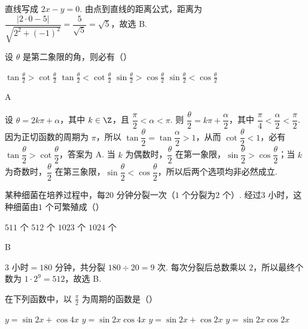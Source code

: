 \begin{solution}
直线写成 \(2x-y=0\). 由点到直线的距离公式，距离为 \(\dfrac{|2\cdot0-5|}{\sqrt{2^{2}+(-1)^{2}}}=\dfrac{5}{\sqrt5}=\sqrt5\)，故选 B.
\end{solution}

\begin{problem}
设 \(\theta\) 是第二象限的角，则必有（\quad）

\choices
    {\(\tan \frac{\theta}{2} > \cot \frac{\theta}{2}\)}
    {\(\tan \frac{\theta}{2} < \cot \frac{\theta}{2}\)}
    {\(\sin \frac{\theta}{2} >\cos \frac{\theta}{2}\)}
    {\(\sin \frac{\theta}{2} < \cos \frac{\theta}{2}\)}
\end{problem}

\begin{answer}
A
\end{answer}

\begin{solution}
设 \(\theta=2k\pi+\alpha\)，其中 \(k\in\Z\)，且 \(\dfrac{\pi}{2}<\alpha<\pi\). 则 \(\dfrac{\theta}{2}=k\pi+\dfrac{\alpha}{2}\)，其中 \(\dfrac{\pi}{4}<\dfrac{\alpha}{2}<\dfrac{\pi}{2}\). 因为正切函数的周期为 \(\pi\)，所以 \(\tan\dfrac{\theta}{2}=\tan\dfrac{\alpha}{2}>1\)，从而 \(\cot\dfrac{\theta}{2}<1\)，必有 \(\tan\dfrac{\theta}{2}>\cot\dfrac{\theta}{2}\)，答案为 A. 当 \(k\) 为偶数时，\(\dfrac{\theta}{2}\) 在第一象限，\(\sin\dfrac{\theta}{2}>\cos\dfrac{\theta}{2}\)；当 \(k\) 为奇数时，\(\dfrac{\theta}{2}\) 在第三象限，\(\sin\dfrac{\theta}{2}<\cos\dfrac{\theta}{2}\)，所以后两个选项均非必然成立.
\end{solution}

\begin{problem}
某种细菌在培养过程中，每\(20\text{ 分钟}\)分裂一次（\(1\text{ 个}\)分裂为\(2\text{ 个}\)）. 经过\(3\text{ 小时}\)，这种细菌由\(1\text{ 个}\)可繁殖成（\quad）

\choices
    {\(511\text{ 个}\)}
    {\(512\text{ 个}\)}
    {\(1023\text{ 个}\)}
    {\(1024\text{ 个}\)}
\end{problem}

\begin{answer}
B
\end{answer}

\begin{solution}
\(3\text{ 小时}=180\text{ 分钟}\)，共分裂 \(180\div20=9\) 次. 每次分裂后总数乘以 \(2\)，所以最终个数为 \(1\cdot2^{9}=512\)，故选 B.
\end{solution}

\begin{problem}
在下列函数中，以 \(\frac{\pi}{2}\) 为周期的函数是（\quad）

\choices
    {\(y = \sin 2x + \cos 4x\)}
    {\(y = \sin 2x\cos 4x\)}
    {\(y = \sin 2x + \cos 2x\)}
    {\(y = \sin 2x\cos 2x\)}
\end{problem}

